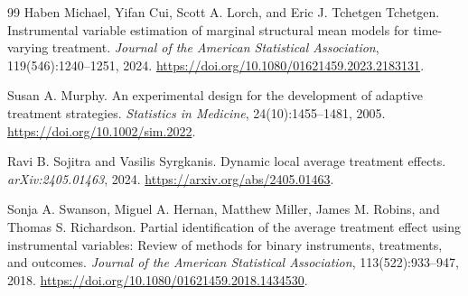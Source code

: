 \documentclass[11pt]{article}
\theoremstyle{definition}
\theoremstyle{plain}
\theoremstyle{remark}
\begin{document}
\begin{thebibliography}{99}
Haben Michael, Yifan Cui, Scott A. Lorch, and Eric J. Tchetgen Tchetgen.
\newblock Instrumental variable estimation of marginal structural mean models for time-varying treatment.
\newblock \emph{Journal of the American Statistical Association}, 119(546):1240--1251, 2024.
\newblock \url{https://doi.org/10.1080/01621459.2023.2183131}.

Susan A. Murphy.
\newblock An experimental design for the development of adaptive treatment strategies.
\newblock \emph{Statistics in Medicine}, 24(10):1455--1481, 2005.
\newblock \url{https://doi.org/10.1002/sim.2022}.

Ravi B. Sojitra and Vasilis Syrgkanis.
\newblock Dynamic local average treatment effects.
\newblock \emph{arXiv:2405.01463}, 2024.
\newblock \url{https://arxiv.org/abs/2405.01463}.

Sonja A. Swanson, Miguel A. Hernan, Matthew Miller, James M. Robins, and Thomas S. Richardson.
\newblock Partial identification of the average treatment effect using instrumental variables: Review of methods for binary instruments, treatments, and outcomes.
\newblock \emph{Journal of the American Statistical Association}, 113(522):933--947, 2018.
\newblock \url{https://doi.org/10.1080/01621459.2018.1434530}.
\end{thebibliography}
\end{document}
